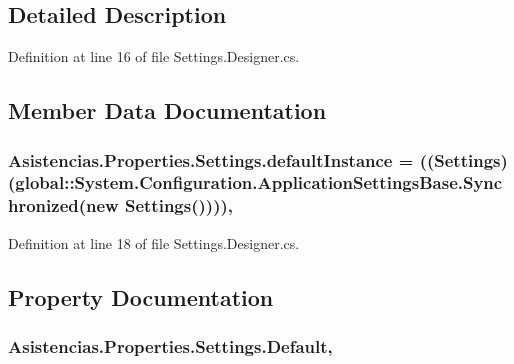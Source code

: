 \subsection{Detailed Description}


Definition at line 16 of file Settings.\-Designer.\-cs.



\subsection{Member Data Documentation}
\hypertarget{class_asistencias_1_1_properties_1_1_settings_a541faf49d98f3ced3a7892c27109780b}{
\subsubsection[{default\-Instance}]{ Asistencias.\-Properties.\-Settings.\-default\-Instance = (({\bf Settings})(global\-::\-System.\-Configuration.\-Application\-Settings\-Base.\-Synchronized(new {\bf Settings}())))\hspace{0.3cm}{\ttfamily [static]}, {\ttfamily [private]}}}\label{class_asistencias_1_1_properties_1_1_settings_a541faf49d98f3ced3a7892c27109780b}


Definition at line 18 of file Settings.\-Designer.\-cs.



\subsection{Property Documentation}
\hypertarget{class_asistencias_1_1_properties_1_1_settings_ae0b0610cb4d0649f9574754f47dfe4b0}{
\subsubsection[{Default}]{ Asistencias.\-Properties.\-Settings.\-Default\hspace{0.3cm}{\ttfamily [static]}, {\ttfamily [get]}}}\label{class_asistencias_1_1_properties_1_1_settings_ae0b0610cb4d0649f9574754f47dfe4b0}


